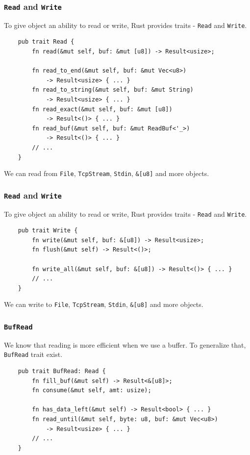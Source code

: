 \documentclass[aspectratio=1610,t]{beamer}
\begin{document}
\begin{frame}[fragile]
\frametitle{\texttt{Read} and \texttt{Write}}
To give object an ability to read or write, Rust provides traits - \texttt{Read} and \texttt{Write}.

\begin{verbatim}
    pub trait Read {
        fn read(&mut self, buf: &mut [u8]) -> Result<usize>;

        fn read_to_end(&mut self, buf: &mut Vec<u8>)
            -> Result<usize> { ... }
        fn read_to_string(&mut self, buf: &mut String)
            -> Result<usize> { ... }
        fn read_exact(&mut self, buf: &mut [u8])
            -> Result<()> { ... }
        fn read_buf(&mut self, buf: &mut ReadBuf<'_>)
            -> Result<()> { ... }
        // ...
    }
\end{verbatim}

We can read from \texttt{File}, \texttt{TcpStream}, \texttt{Stdin}, \texttt{\&[u8]} and more objects.
\end{frame}


\begin{frame}[fragile]
\frametitle{\texttt{Read} and \texttt{Write}}
To give object an ability to read or write, Rust provides traits - \texttt{Read} and \texttt{Write}.

\begin{verbatim}
    pub trait Write {
        fn write(&mut self, buf: &[u8]) -> Result<usize>;
        fn flush(&mut self) -> Result<()>;
    
        fn write_all(&mut self, buf: &[u8]) -> Result<()> { ... }
        // ...
    }
\end{verbatim}

We can write to \texttt{File}, \texttt{TcpStream}, \texttt{Stdin}, \texttt{\&[u8]} and more objects.
\end{frame}


\begin{frame}[fragile]
\frametitle{\texttt{BufRead}}
We know that reading is more efficient when we use a buffer. To generalize that, \texttt{BufRead} trait exist.

\begin{verbatim}
    pub trait BufRead: Read {
        fn fill_buf(&mut self) -> Result<&[u8]>;
        fn consume(&mut self, amt: usize);

        fn has_data_left(&mut self) -> Result<bool> { ... }
        fn read_until(&mut self, byte: u8, buf: &mut Vec<u8>)
            -> Result<usize> { ... }
        // ...
    }
\end{verbatim}
\end{frame}
\end{document}
